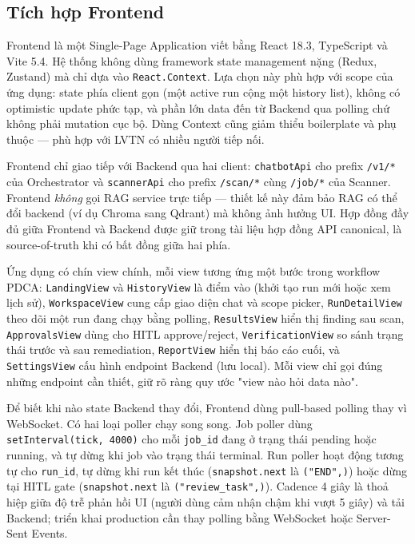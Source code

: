 \subsection{Tích hợp Frontend}
\label{sub:frontend_integration}

Frontend là một Single-Page Application viết bằng React 18.3, TypeScript và Vite 5.4. Hệ thống không dùng framework state management nặng (Redux, Zustand) mà chỉ dựa vào \texttt{React.Context}. Lựa chọn này phù hợp với scope của ứng dụng: state phía client gọn (một active run cộng một history list), không có optimistic update phức tạp, và phần lớn data đến từ Backend qua polling chứ không phải mutation cục bộ. Dùng Context cũng giảm thiểu boilerplate và phụ thuộc — phù hợp với LVTN có nhiều người tiếp nối.

Frontend chỉ giao tiếp với Backend qua hai client: \texttt{chatbotApi} cho prefix \texttt{/v1/*} của Orchestrator và \texttt{scannerApi} cho prefix \texttt{/scan/*} cùng \texttt{/job/*} của Scanner. Frontend \emph{không} gọi RAG service trực tiếp — thiết kế này đảm bảo RAG có thể đổi backend (ví dụ Chroma sang Qdrant) mà không ảnh hưởng UI. Hợp đồng đầy đủ giữa Frontend và Backend được giữ trong tài liệu hợp đồng API canonical, là source-of-truth khi có bất đồng giữa hai phía.

Ứng dụng có chín view chính, mỗi view tương ứng một bước trong workflow PDCA: \texttt{LandingView} và \texttt{HistoryView} là điểm vào (khởi tạo run mới hoặc xem lịch sử), \texttt{WorkspaceView} cung cấp giao diện chat và scope picker, \texttt{RunDetailView} theo dõi một run đang chạy bằng polling, \texttt{ResultsView} hiển thị finding sau scan, \texttt{ApprovalsView} dùng cho HITL approve/reject, \texttt{VerificationView} so sánh trạng thái trước và sau remediation, \texttt{ReportView} hiển thị báo cáo cuối, và \texttt{SettingsView} cấu hình endpoint Backend (lưu local). Mỗi view chỉ gọi đúng những endpoint cần thiết, giữ rõ ràng quy ước "view nào hỏi data nào".

Để biết khi nào state Backend thay đổi, Frontend dùng pull-based polling thay vì WebSocket. Có hai loại poller chạy song song. Job poller dùng \texttt{setInterval(tick, 4000)} cho mỗi \texttt{job\_id} đang ở trạng thái pending hoặc running, và tự dừng khi job vào trạng thái terminal. Run poller hoạt động tương tự cho \texttt{run\_id}, tự dừng khi run kết thúc (\texttt{snapshot.next} là \texttt{("END",)}) hoặc dừng tại HITL gate (\texttt{snapshot.next} là \texttt{("review\_task",)}). Cadence 4 giây là thoả hiệp giữa độ trễ phản hồi UI (người dùng cảm nhận chậm khi vượt 5 giây) và tải Backend; triển khai production cần thay polling bằng WebSocket hoặc Server-Sent Events.

